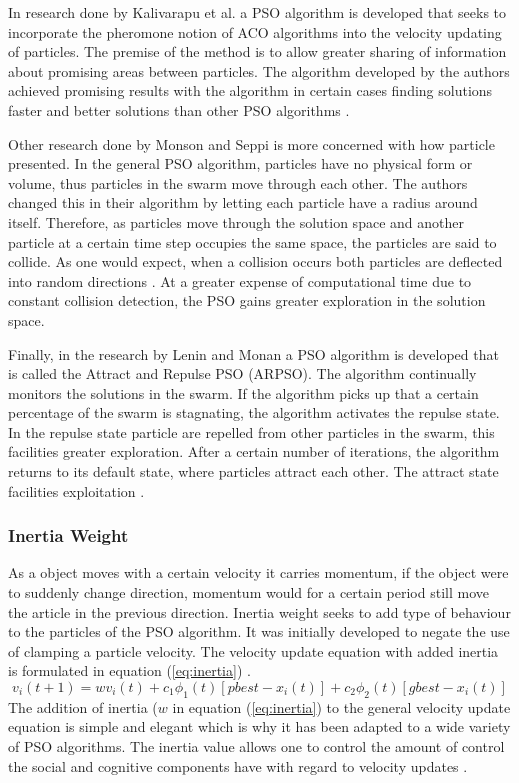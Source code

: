 In research done by Kalivarapu et al. \cite{PSOPheromones} a PSO algorithm is developed that seeks to incorporate the pheromone notion of ACO algorithms into the velocity updating of particles. The premise of the method is to allow greater sharing of information about promising areas between particles. The algorithm developed by the authors achieved promising results with the algorithm in certain cases finding solutions faster and better solutions than other PSO algorithms \cite{PSOPheromones}. 

Other research done by Monson and Seppi \cite{adaptPSO} is more concerned with how particle presented. In the general PSO algorithm, particles have no physical form or volume, thus particles in the swarm move through each other. The authors changed this in their algorithm by letting each particle have a radius around itself. Therefore, as particles move through the solution space and another particle at a certain time step occupies the same space, the particles are said to collide. As one would expect, when a collision occurs both particles are deflected into random directions \cite{adaptPSO}. At a greater expense of computational time due to constant collision detection, the PSO gains greater exploration in the solution space. 

Finally, in the research by Lenin and Monan a PSO algorithm is developed that is called the Attract and Repulse PSO (ARPSO). The algorithm continually monitors the solutions in the swarm. If the algorithm picks up that a certain percentage of the swarm is stagnating, the algorithm activates the repulse state. In the repulse state particle are repelled from other particles in the swarm, this facilities greater exploration. After a certain number of iterations, the algorithm returns to its default state, where particles attract each other. The attract state facilities exploitation \cite{PSOAttractRepulse}.
\subsubsection{Inertia Weight}
As a object moves with a certain velocity it carries momentum, if the object were to suddenly change direction, momentum would for a certain period still move the article in the previous direction. Inertia weight seeks to add type of behaviour to the particles of the PSO algorithm. It was initially developed to negate the use of clamping a particle velocity. The velocity update equation with added inertia is formulated in equation (\ref{eq:inertia}) \cite{FundamentalSwarm}.
\begin{equation}
v_i(t+1) = wv_i(t) + c_1\phi_{1}(t)[pbest - x_i(t)] + c_2\phi_{2}(t)[gbest - x_i(t)]\label{eq:inertia}
\end{equation}
The addition of inertia ($w$ in equation (\ref{eq:inertia}) to the general velocity update equation is simple and elegant which is why it has been adapted to a wide variety of PSO algorithms. The inertia value allows one to control the amount of control the social and cognitive components have with regard to velocity updates \cite{FundamentalSwarm}. 

